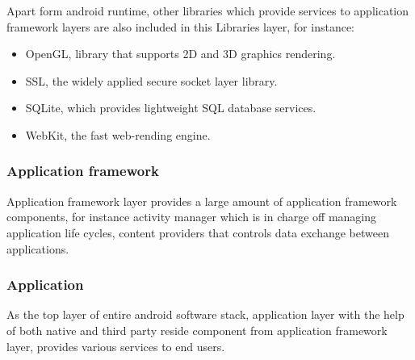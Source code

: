 Apart form  android runtime, other libraries which provide services to application framework layers are also included in this Libraries layer, for instance:
\begin{itemize}
\item OpenGL, library that supports 2D and 3D graphics rendering.
\item SSL, the widely applied secure socket layer library.
\item  SQLite, which provides lightweight SQL database services.
\item  WebKit, the fast  web-rending engine.
\end{itemize}
\subsubsection{Application  framework} Application framework layer provides a large amount of application framework components, for instance activity manager which is in charge off managing application life cycles, content providers that controls data exchange between applications.
\subsubsection{Application}As the top layer of entire android software stack, application layer with the help of both native and third party reside component from application framework layer, provides various services to end users.

